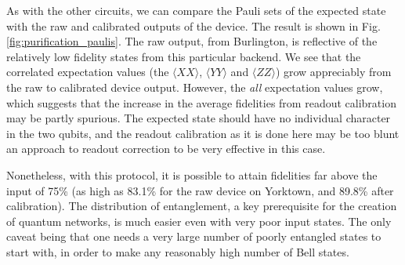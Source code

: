 As with the other circuits, we can compare the Pauli sets of the expected state
with the raw and calibrated outputs of the device. The result is shown in Fig.
\ref{fig:purification_paulis}. The raw output, from Burlington, is reflective of
the relatively low fidelity states from this particular backend. We see that the
correlated expectation values (the $\langle XX \rangle$, $\langle YY \rangle$
and $\langle ZZ \rangle$) grow appreciably from the raw to calibrated device
output. However, the \textit{all} expectation values grow, which suggests that
the increase in the average fidelities from readout calibration may be partly
spurious. The expected state should have no individual character in the two
qubits, and the readout calibration as it is done here may be too blunt an
approach to readout correction to be very effective in this case.

Nonetheless, with this protocol, it is possible to attain fidelities far above
the input of 75\% (as high as 83.1\% for the raw device on Yorktown, and 89.8\%
after calibration). The distribution of entanglement, a key prerequisite for the
creation of quantum networks, is much easier even with very poor input states.
The only caveat being that one needs a very large number of poorly entangled
states to start with, in order to make any reasonably high number of Bell states.

